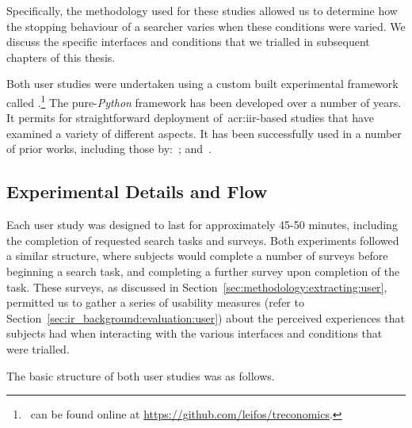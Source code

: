 Specifically, the methodology used for these studies allowed us to determine how the stopping behaviour of a searcher varies when these conditions were varied. We discuss the specific interfaces and conditions that we trialled in subsequent chapters of this thesis.

Both user studies were undertaken using a custom built experimental framework called .\footnote{\treconomics~can be found online at \url{https://github.com/leifos/treconomics}. } The pure-\emph{Python} framework has been developed over a number of years. It permits for straightforward deployment of~\gls{acr:iir}-based studies that have examined a variety of different aspects. It has been successfully used in a number of prior works, including those by:~\cite{azzopardi2013query_cost, maxwell2014temporal_delays, kelly2015serp_size, edwards2015query_interface}; and~\cite{crescenzi2016time_constraints}.


\subsection{Experimental Details and Flow}\label{sec:methodology:user:flow}
Each user study was designed to last for approximately 45-50 minutes, including the completion of requested search tasks and surveys. Both experiments followed a similar structure, where subjects would complete a number of surveys before beginning a search task, and completing a further survey upon completion of the task. These surveys, as discussed in Section~\ref{sec:methodology:extracting:user}, permitted us to gather a series of usability measures (refer to Section~\ref{sec:ir_background:evaluation:user}) about the perceived experiences that subjects had when interacting with the various interfaces and conditions that were trialled.

The basic structure of both user studies was as follows.

